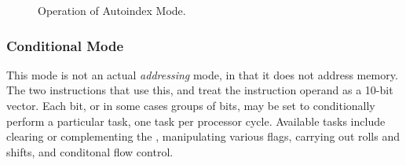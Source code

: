 \begin{figure}[htb]
 \centering
\caption[Autoindex Mode]{\label{fig:autoindex-mode} Operation
  of Autoindex Mode.}
\end{figure}









\subsubsection{Conditional Mode}
\label{sec:conditional-mode}

This mode is not an actual {\em addressing} mode, in that it does not address
memory. The two instructions that use this,  and  treat the
instruction operand as a 10-bit vector. Each bit, or in some cases groups of
bits, may be set to conditionally perform a particular task, one task per
processor cycle. Available tasks include clearing or complementing the \AC,
manipulating various flags, carrying out rolls and shifts, and conditonal flow
control.

